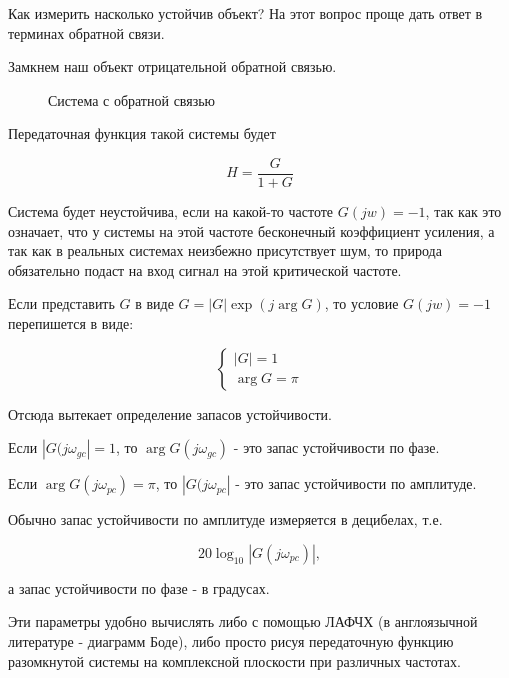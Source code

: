 \documentclass[12pt,a4paper]{article}
\begin{document}
Как измерить насколько устойчив объект? На этот вопрос проще дать ответ в терминах обратной связи.

Замкнем наш объект отрицательной обратной связью.

\begin{figure}
	\caption{Система с обратной связью}
\end{figure}

Передаточная функция такой системы будет

$$ H = \frac{G}{1+G} $$

Система будет неустойчива, если на какой-то частоте $G(jw) = -1$, так как это означает, что у системы на этой частоте бесконечный коэффициент усиления, а так как в реальных системах неизбежно присутствует шум, то природа обязательно подаст на вход сигнал на этой критической частоте. 

Если представить $G$ в виде $G = |G|\exp(j\arg G)$, то условие $G(jw) = -1$ перепишется в виде:

\begin{equation*}
	\begin{cases}
		|G| = 1 \\
		\arg G = \pi
	\end{cases}
\end{equation*}

Отсюда вытекает определение запасов устойчивости.

Если $|G(j\omega_{gc}| = 1$, то $\arg G(j\omega_{gc})$ - это запас устойчивости по фазе.

Если $\arg G(j\omega_{pc}) = \pi$, то $|G(j\omega_{pc}|$ - это запас устойчивости по амплитуде.

Обычно запас устойчивости по амплитуде измеряется в децибелах, т.е.

$$ 20 \log_{10} |G(j\omega_{pc})|, $$

а запас устойчивости по фазе - в градусах.

Эти параметры удобно вычислять либо с помощью ЛАФЧХ (в англоязычной литературе - диаграмм Боде), либо просто рисуя передаточную функцию разомкнутой системы на комплексной плоскости при различных частотах.
\end{document}
